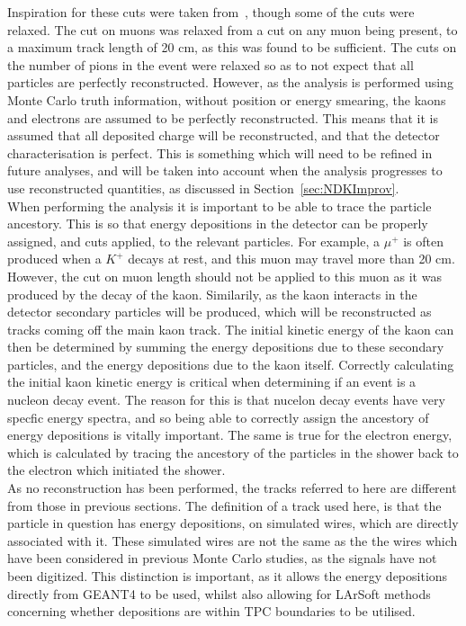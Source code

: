 Inspiration for these cuts were taken from~\citep{Bueno}, though some of the cuts were relaxed. The cut on muons was relaxed from a cut on any muon being present, to a maximum track length of 20 cm, as this was found to be sufficient. The cuts on the number of pions in the event were relaxed so as to not expect that all particles are perfectly reconstructed. However, as the analysis is performed using Monte Carlo truth information, without position or energy smearing, the kaons and electrons are assumed to be perfectly reconstructed. This means that it is assumed that all deposited charge will be reconstructed, and that the detector characterisation is perfect. This is something which will need to be refined in future analyses, and will be taken into account when the analysis progresses to use reconstructed quantities, as discussed in Section~\ref{sec:NDKImprov}. \\ 

When performing the analysis it is important to be able to trace the particle ancestory. This is so that energy depositions in the detector can be properly assigned, and cuts applied, to the relevant particles. For example, a $\mu^{+}$ is often produced when a $K^{+}$ decays at rest, and this muon may travel more than 20 cm. However, the cut on muon length should not be applied to this muon as it was produced by the decay of the kaon. Similarily, as the kaon interacts in the detector secondary particles will be produced, which will be reconstructed as tracks coming off the main kaon track. The initial kinetic energy of the kaon can then be determined by summing the energy depositions due to these secondary particles, and the energy depositions due to the kaon itself. Correctly calculating the initial kaon kinetic energy is critical when determining if an event is a nucleon decay event. The reason for this is that nucelon decay events have very specfic energy spectra, and so being able to correctly assign the ancestory of energy depositions is vitally important. The same is true for the electron energy, which is calculated by tracing the ancestory of the particles in the shower back to the electron which initiated the shower.\\

As no reconstruction has been performed, the tracks referred to here are different from those in previous sections. The definition of a track used here, is that the particle in question has energy depositions, on simulated wires, which are directly associated with it. These simulated wires are not the same as the the wires which have been considered in previous Monte Carlo studies, as the signals have not been digitized. This distinction is important, as it allows the energy depositions directly from GEANT4 to be used, whilst also allowing for LArSoft methods concerning whether depositions are within TPC boundaries to be utilised. \\

